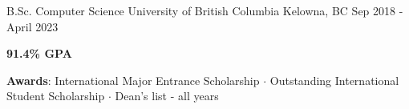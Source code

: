 

\begin{cventries}


  \cventry
    {B.Sc. Computer Science} %
    {University of British Columbia} %
    {Kelowna, BC} %
    {Sep 2018 - April 2023} %
    {
      \begin{cvitems} %
        \item {\textbf{91.4\% GPA}}
        \item {\textbf{Awards}: International Major Entrance Scholarship $\cdot$ Outstanding International Student Scholarship $\cdot$ Dean's list - all years} 
      \end{cvitems}
    }

\end{cventries}



